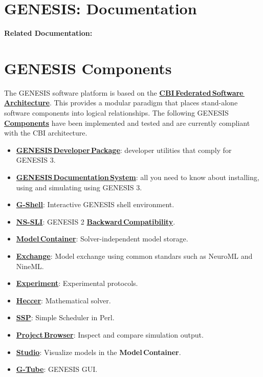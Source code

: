 \documentclass[12pt]{article}
\begin{document}
\section*{GENESIS: Documentation}

{\bf Related Documentation:}

\section*{GENESIS Components}

The GENESIS software platform is based on the \href{../genesis-overview/genesis-overview.tex}{\bf CBI\,Federated\,Software\,Architecture}. This provides a modular paradigm that places stand-alone software components into logical relationships. The following GENESIS \href{../reserved-words/reserved-words.tex}{\bf Components} have been implemented and tested and are currently compliant with the CBI architecture.

\begin{itemize}
   \item[]\href{../developer-package/developer-package.tex}{\bf GENESIS\,Developer\,Package}: developer utilities that comply for GENESIS 3.
   \item[]\href{../documentation-overview/documentation-overview.tex}{\bf GENESIS\,Documentation\,System}: all you need to know about installing, using and simulating using GENESIS 3.
   \item[]\href{../gshell/gshell.tex}{\bf G-Shell}: Interactive GENESIS shell environment.
   \item[]\href{../ns-sli/ns-sli.tex}{\bf NS-SLI}: GENESIS 2 \href{../backward-compatibility/backward-compatibility.tex}{\bf Backward\,Compatibility}.
   \item[]\href{../model-container/model-container.tex}{\bf Model\,Container}: Solver-independent model storage.
   \item[]\href{../exchange/exchange.tex}{\bf Exchange}: Model exchange using common standars such as NeuroML and NineML.
   \item[]\href{../experiment/experiment.tex}{\bf Experiment}: Experimental protocols.
   \item[]\href{../heccer/heccer.tex}{\bf Heccer}: Mathematical solver.
   \item[]\href{../ssp/ssp.tex}{\bf SSP}: Simple Scheduler in Perl.
   \item[]\href{../project-browser/project-browser.tex}{\bf Project\,Browser}: Inspect and compare simulation output.
   \item[]\href{../studio/studio.tex}{\bf Studio}: Visualize models in the {\bf Model\,Container}.
   \item[]\href{../gtube/gtube.tex}{\bf G-Tube}: GENESIS GUI.
\end{itemize}
\end{document}
